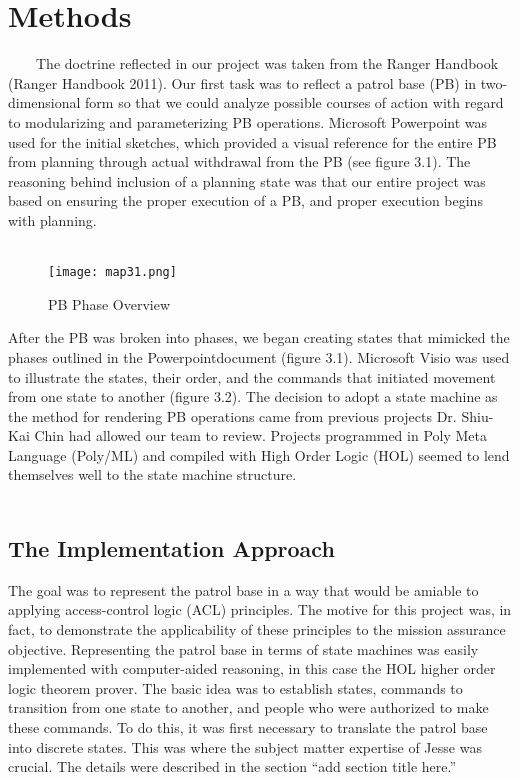 
\section{Methods}
\label{sec:methods}

\ \ \ \ The doctrine reflected in our project was taken from the Ranger Handbook
(Ranger Handbook 2011). Our first task was to reflect a patrol base (PB)
in two-dimensional form so that we could analyze possible courses of action
with regard to modularizing and parameterizing PB operations. Microsoft\textregistered
Powerpoint was used for the initial sketches, which provided a visual
reference for the entire PB from planning through actual withdrawal from
the PB (see figure 3.1). The reasoning behind inclusion of a planning state
was that our entire project was based on ensuring the proper execution of
a PB, and proper execution begins with planning.\ \\\\

\begin{figure}[h]
  \centering
  \texttt{[image: map31.png]}
  \caption{PB Phase Overview}
\end{figure}
After the PB was broken into phases, we began creating states that mimicked
the phases outlined in the Powerpoint\textcopyright document (figure 3.1). Microsoft\textregistered
Visio was used to illustrate the states, their order, and the commands that
initiated movement from one state to another (figure 3.2). The decision to
adopt a state machine as the method for rendering PB operations came from
previous projects Dr. Shiu-Kai Chin had allowed our team to review. Projects
programmed in Poly Meta Language (Poly/ML) and compiled with High Order
Logic (HOL) seemed to lend themselves well to the state machine structure.\\ \\

\subsection{The Implementation Approach}
\label{sec:impl-appr-1}

The goal was to represent the patrol base in a way that would be amiable to applying access-control
logic (ACL) principles. The motive for this project was, in fact, to demonstrate the applicability
of these principles to the mission assurance objective. Representing the patrol base in terms of
state machines was easily implemented with computer-aided reasoning, in this case the HOL higher
order logic theorem prover. The basic idea was to establish states, commands to transition from one
state to another, and people who were authorized to make these commands. To do this, it was first
necessary to translate the patrol base into discrete states. This was where the subject matter
expertise of Jesse was crucial. The details were described in the section “add section title here.”

